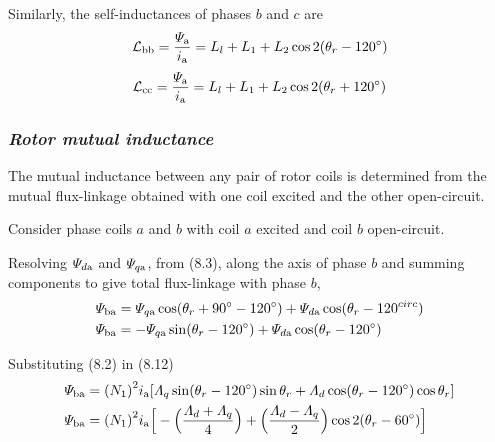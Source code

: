\documentclass[a4paper,numbers=noenddot,12pt]{scrbook}
\begin{document}
        Similarly, the self-inductances of phases $b$ and $c$ are
        \begin{equation}
            \mathcal{L}_{\textup{bb}} = \dfrac{\varPsi_{\textup{a}}}{i_{\textup{a}}} = L_l +L_1 +L_2 \cos 2(\theta_r - 120^{\circ})
            \label{eq:Eq8.10}
        \end{equation}
        \begin{equation}
            \mathcal{L}_{\textup{cc}} = \dfrac{\varPsi_{\textup{a}}}{i_{\textup{a}}} = L_l +L_1 +L_2 \cos 2(\theta_r + 120^{\circ})
            \label{eq:Eq8.11}
        \end{equation}

        \subsubsection{\textit{Rotor mutual inductance}}
        The mutual inductance between any pair of rotor coils is determined from the mutual flux-linkage obtained with one coil excited and the other open-circuit.

        Consider phase coils $a$ and $b$ with coil $a$ excited and coil $b$ open-circuit.

        Resolving $\varPsi_{d\textup{a}}$ and $\varPsi_{q\textup{a}}$, from (8.3), along the axis of phase $b$ and summing components to give total flux-linkage with phase $b$,
        \begin{align}
            \varPsi_{\textup{ba}} & = \varPsi_{q\textup{a}} \cos (\theta_r + 90^{\circ} -120^{\circ}) +\varPsi_{d\textup{a}} \cos(\theta_r - 120^{circ}) \nonumber \\
            \varPsi_{\textup{ba}} & = -\varPsi_{q\textup{a}} \sin (\theta_r - 120^{\circ}) + \varPsi_{d\textup{a}} \cos(\theta_r -120^{\circ}) 
            \label{eq:Eq8.12}
        \end{align}

        Substituting (8.2) in (8.12)
        \begin{align}
            \varPsi_{\textup{ba}} & = {(N_1)}^2 i_{\textup{a}}[\varLambda_q \sin(\theta_r -120^{\circ}) \sin \theta_r + \varLambda_d \cos(\theta_r -120^{\circ}) \cos \theta_r] \nonumber \\
            \varPsi_{\textup{ba}} & = {(N_1)}^2 i_{\textup{a}} \Big[ - \Big( \dfrac{\varLambda_d + \varLambda_q}{4} \Big) + \Big( \dfrac{\varLambda_d - \varLambda_q}{2}\Big) \cos 2(\theta_r - 60^{\circ})\Big]
            \label{eq:Eq8.13}
        \end{align}
\end{document}
